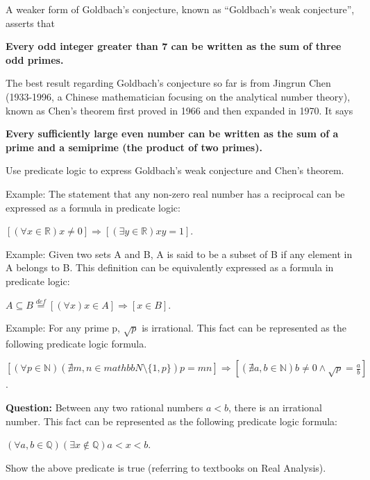 \documentclass{article}
\begin{document}
A weaker form of Goldbach's conjecture, known as “Goldbach's weak conjecture”, asserts that

\textbf{Every odd integer greater than 7 can be written as the sum of three odd primes.}

The best result regarding Goldbach's conjecture so far is from Jingrun Chen (1933-1996, a Chinese mathematician focusing on the analytical number theory), known as Chen's theorem first proved in 1966 and then expanded in 1970. It says

\textbf{Every suﬀiciently large even number can be written as the sum of a prime and a semiprime (the product of two primes).}

Use predicate logic to express Goldbach's weak conjecture and Chen's theorem.


\begin{tcolorbox}
  Example: The statement that any non-zero real number has a reciprocal can be expressed as a formula in predicate logic:
  
  $ [(\forall x \in \mathbb{R})x \neq 0] \Rightarrow [(\exists y \in \mathbb{R})xy = 1] $.
\end{tcolorbox}

\begin{tcolorbox}
  Example: Given two sets A and B, A is said to be a subset of B if any element in A belongs to B. This definition can be equivalently expressed as a formula in predicate logic:
  
  $A\subseteq B \overset{def}{=} [(\forall x)x \in A] \Rightarrow [x \in B] $.
\end{tcolorbox}
\begin{tcolorbox}
  Example: For any prime p, $\sqrt{p} $ is irrational. This fact can be represented as the following predicate logic formula.

  $[(\forall p \in \mathbb{N})(\nexists m,n \in mathbb{N} \setminus \{1, p\} )p=mn] \Rightarrow [(\nexists a, b \in \mathbb{N})b \neq 0 \land \sqrt{p}=\frac{a}{b}]$.

\end{tcolorbox}

\begin{tcolorbox}
  \textbf{Question:} Between any two rational numbers $a < b$, there is an irrational number. This fact can be represented as the following predicate logic formula: 
  
  $ (\forall a, b \in \mathbb{Q})(\exists x \notin \mathbb{Q})a < x < b $.
  
  Show the above predicate is true (referring to textbooks on Real Analysis).
\end{tcolorbox}
\end{document}
